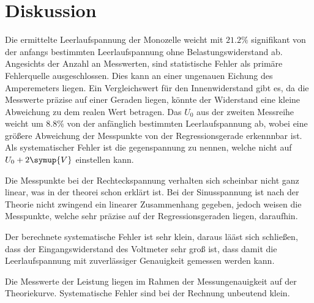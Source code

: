 \section{Diskussion}
\label{sec:Diskussion}

Die ermittelte Leerlaufspannung der Monozelle weicht mit $21.2 \%$ signifikant von der anfangs bestimmten Leerlaufspannung ohne
Belastungswiderstand ab. Angesichts der Anzahl an Messwerten, sind statistische Fehler als primäre Fehlerquelle ausgeschlossen.
Dies kann an einer ungenauen Eichung des Amperemeters liegen. Ein Vergleichswert für
den Innenwiderstand gibt es, da die Messwerte präzise auf einer Geraden liegen, könnte der Widerstand
eine kleine Abweichung zu dem realen Wert betragen. Das $U_0$ aus der zweiten Messreihe weicht um $8.8\%$
von der anfänglich bestimmten Leerlaufspannung ab, wobei eine größere Abweichung der Messpunkte von der Regressionsgerade
erkennnbar ist. Als systematischer Fehler ist die gegenspannung zu nennen, welche nicht auf $U_0 +2\symup{V}$
einstellen kann.

Die Messpunkte bei der Rechteckspannung verhalten sich scheinbar nicht ganz linear, was in der theorei schon erklärt ist. Bei der
Sinusspannung ist nach der Theorie nicht zwingend ein linearer Zusammenhang gegeben, jedoch weisen die Messpunkte, welche
sehr präzise auf der Regressionsgeraden liegen, daraufhin.

Der berechnete systematische Fehler ist sehr klein, daraus lääst sich schließen, dass der Eingangswiderstand des
Voltmeter sehr groß ist, dass damit die Leerlaufspannung mit zuverlässiger Genauigkeit gemessen werden kann.

Die Messwerte der Leistung liegen im Rahmen der Messungenauigkeit auf der Theoriekurve. Systematische Fehler
sind bei der Rechnung unbeutend klein.
